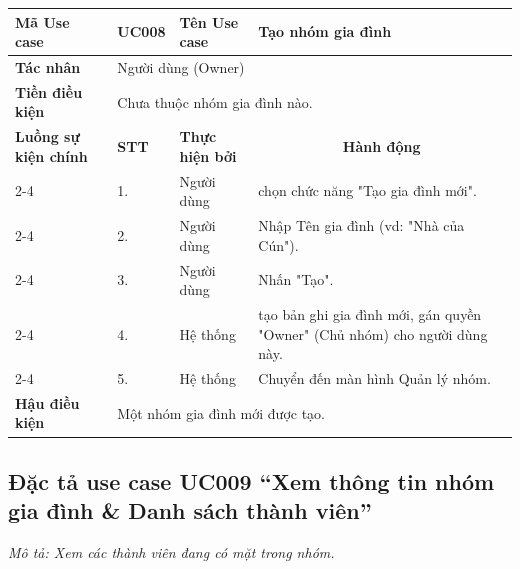 \documentclass[../main.tex]{subfiles}
\begin{document}
\begingroup
\renewcommand{\arraystretch}{1.5}

\begin{longtable}{|p{2.7cm}|p{0.8cm}|p{2.6cm}|p{7.3cm}|}
\hline
\cellcolor[HTML]{D5F5E3}\textbf{Mã Use case} & \multicolumn{1}{l|}{UC008} & \cellcolor[HTML]{D5F5E3}\textbf{Tên Use case} & Tạo nhóm gia đình \\ \hline
\cellcolor[HTML]{D5F5E3}\textbf{Tác nhân} & \multicolumn{3}{p{10.7cm}|}{Người dùng (Owner)} \\ \hline
\cellcolor[HTML]{D5F5E3}\textbf{Tiền điều kiện} & \multicolumn{3}{p{10.7cm}|}{Chưa thuộc nhóm gia đình nào.} \\ \hline

\cellcolor[HTML]{D5F5E3}\textbf{Luồng sự kiện chính} & \cellcolor[HTML]{FDEBD0}\textbf{STT} & \cellcolor[HTML]{FDEBD0}\textbf{Thực hiện bởi} & \multicolumn{1}{c|}{\cellcolor[HTML]{FDEBD0}\textbf{Hành động}} \\ \cline{2-4} 
\cellcolor[HTML]{D5F5E3} & 1. & Người dùng & chọn chức năng "Tạo gia đình mới". \\ \cline{2-4} 
\cellcolor[HTML]{D5F5E3} & 2. & Người dùng & Nhập Tên gia đình (vd: "Nhà của Cún"). \\ \cline{2-4} 
\cellcolor[HTML]{D5F5E3} & 3. & Người dùng & Nhấn "Tạo". \\ \cline{2-4} 
\cellcolor[HTML]{D5F5E3} & 4. & Hệ thống & tạo bản ghi gia đình mới, gán quyền "Owner" (Chủ nhóm) cho người dùng này. \\ \cline{2-4} 
\cellcolor[HTML]{D5F5E3} & 5. & Hệ thống & Chuyển đến màn hình Quản lý nhóm. \\ \hline

\cellcolor[HTML]{D5F5E3}\textbf{Hậu điều kiện} & \multicolumn{3}{p{10.7cm}|}{Một nhóm gia đình mới được tạo.} \\ \hline
\end{longtable}
\endgroup

\subsection{Đặc tả use case UC009 ``Xem thông tin nhóm gia đình \& Danh sách thành viên''}
\textit{Mô tả: Xem các thành viên đang có mặt trong nhóm.}
\vspace{0.5cm}
\end{document}
